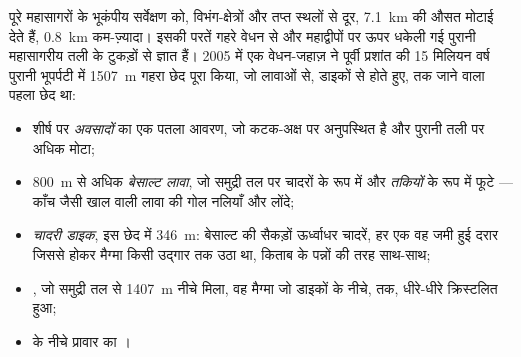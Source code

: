 पूरे महासागरों के भूकंपीय सर्वेक्षण  को, विभंग-क्षेत्रों और तप्त स्थलों से दूर,
\qty{7.1}{km} की औसत मोटाई देते हैं, \qty{0.8}{km} कम-ज़्यादा। इसकी परतें गहरे वेधन से और
महाद्वीपों पर ऊपर धकेली गई पुरानी महासागरीय तली के टुकड़ों से ज्ञात हैं। 2005 में एक वेधन-जहाज़
ने पूर्वी प्रशांत की 15 मिलियन वर्ष पुरानी भूपर्पटी में \qty{1507}{m} गहरा
छेद पूरा किया, जो लावाओं से, डाइकों से होते हुए,
 तक जाने वाला पहला छेद था:

\begin{itemize}
  \item शीर्ष पर \emph{अवसादों} का एक पतला आवरण, जो कटक-अक्ष पर
        अनुपस्थित है और पुरानी तली पर अधिक मोटा;
  \item \qty{800}{m} से अधिक \emph{बेसाल्ट लावा}, जो समुद्री तल पर
        चादरों के रूप में और \emph{तकियों} के रूप में फूटे --- काँच जैसी खाल वाली
        लावा की गोल नलियाँ और लोंदे;
  \item \emph{चादरी डाइक}, इस छेद में \qty{346}{m}: बेसाल्ट की सैकड़ों
        ऊर्ध्वाधर चादरें, हर एक वह जमी हुई दरार जिससे होकर मैग्मा
        किसी उद्गार तक उठा था, किताब के पन्नों की तरह साथ-साथ;
  \item \emph{}, जो समुद्री तल से \qty{1407}{m} नीचे मिला, वह मैग्मा
        जो डाइकों के नीचे,  तक, धीरे-धीरे क्रिस्टलित हुआ;
  \item {} के नीचे प्रावार का \emph{}।
\end{itemize}

